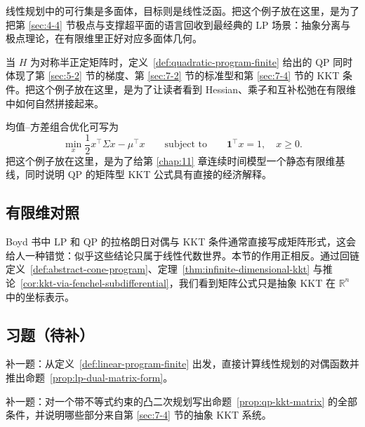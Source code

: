 \begin{example}[多面体上线性目标]
线性规划中的可行集是多面体，目标则是线性泛函。把这个例子放在这里，是为了把第 \ref{sec:4-4} 节极点与支撑超平面的语言回收到最经典的 LP 场景：抽象分离与极点理论，在有限维里正好对应多面体几何。
\end{example}

\begin{example}[标准二次规划]
当 $H$ 为对称半正定矩阵时，定义~\ref{def:quadratic-program-finite} 给出的 QP 同时体现了第 \ref{sec:5-2} 节的梯度、第 \ref{sec:7-2} 节的标准型和第 \ref{sec:7-4} 节的 KKT 条件。把这个例子放在这里，是为了让读者看到 Hessian、乘子和互补松弛在有限维中如何自然拼接起来。
\end{example}

\begin{example}[均值--方差投资组合]
均值--方差组合优化可写为
\[
\min_x \frac12 x^\top \Sigma x-\mu^\top x
\qquad \text{subject to}\qquad
\mathbf 1^\top x=1,\quad x\ge 0.
\]
把这个例子放在这里，是为了给第 \ref{chap:11} 章连续时间模型一个静态有限维基线，同时说明 QP 的矩阵型 KKT 公式具有直接的经济解释。
\end{example}

\subsection*{有限维对照}

Boyd 书中 LP 和 QP 的拉格朗日对偶与 KKT 条件通常直接写成矩阵形式，这会给人一种错觉：似乎这些结论只属于线性代数世界。本节的作用正相反。通过回链定义~\ref{def:abstract-cone-program}、定理~\ref{thm:infinite-dimensional-kkt} 与推论~\ref{cor:kkt-via-fenchel-subdifferential}，我们看到矩阵公式只是抽象 KKT 在 $\mathbb R^n$ 中的坐标表示。

\subsection*{习题（待补）}

\begin{exercise}[LP 对偶占位]
补一题：从定义~\ref{def:linear-program-finite} 出发，直接计算线性规划的对偶函数并推出命题~\ref{prop:lp-dual-matrix-form}。
\end{exercise}

\begin{exercise}
补一题：对一个带不等式约束的凸二次规划写出命题~\ref{prop:qp-kkt-matrix} 的全部条件，并说明哪些部分来自第 \ref{sec:7-4} 节的抽象 KKT 系统。
\end{exercise}
